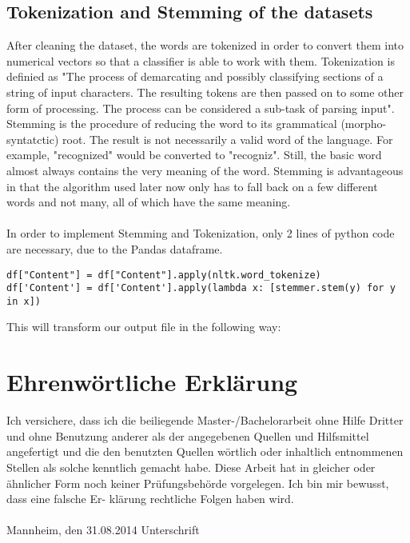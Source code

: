 \documentclass[11pt,titlepage,oneside,openany]{book}
\begin{document}
\subsection{Tokenization and Stemming of the datasets}
After cleaning the dataset, the words are tokenized in order to convert them into numerical vectors so that a classifier is able to work with them. Tokenization is definied as "The process of demarcating and possibly classifying sections of a string of input characters. The resulting tokens are then passed on to some other form of processing. The process can be considered a sub-task of parsing input".\\
\noindent Stemming is the procedure of reducing the word to its grammatical (morpho-syntatctic) root. The result is not necessarily a valid word of the language. For example, "recognized" would be converted to "recogniz". Still, the basic word almost always contains the very meaning of the word. Stemming is advantageous in that the algorithm used later now only has to fall back on a few different words and not many, all of which have the same meaning.\\
\\
\noindent In order to implement Stemming and Tokenization, only 2 lines of python code are necessary, due to the Pandas dataframe. 
\begin{lstlisting}[frame=single]
df["Content"] = df["Content"].apply(nltk.word_tokenize)
df['Content'] = df['Content'].apply(lambda x: [stemmer.stem(y) for y in x])
\end{lstlisting}
This will transform our output file in the following way:
\begin{figure}[h]
\end{figure}

\newpage


\pagestyle{empty}


\section*{Ehrenw\"ortliche Erkl\"arung}
Ich versichere, dass ich die beiliegende Master-/Bachelorarbeit ohne Hilfe Dritter
und ohne Benutzung anderer als der angegebenen Quellen und Hilfsmittel
angefertigt und die den benutzten Quellen w\"ortlich oder inhaltlich
entnommenen Stellen als solche kenntlich gemacht habe. Diese Arbeit
hat in gleicher oder \"ahnlicher Form noch keiner Pr\"ufungsbeh\"orde
vorgelegen. Ich bin mir bewusst, dass eine falsche Er- kl\"arung rechtliche Folgen haben
wird.
\\
\\

\noindent
Mannheim, den 31.08.2014 \hspace{4cm} Unterschrift
\end{document}
